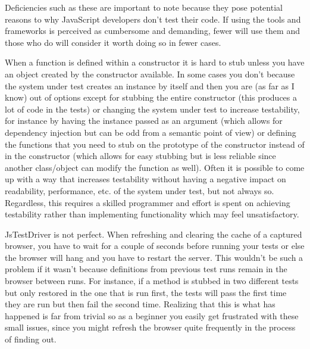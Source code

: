 \documentclass[11pt]{article}
\begin{document}
Deficiencies such as these are important to note because they pose potential reasons to why JavaScript developers don't test their code. If using the tools and frameworks is perceived as cumbersome and demanding, fewer will use them and those who do will consider it worth doing so in fewer cases.

When a function is defined within a constructor it is hard to stub unless you have an object created by the constructor available. In some cases you don't because the system under test creates an instance by itself and then you are (as far as I know) out of options except for stubbing the entire constructor (this produces a lot of code in the tests) or changing the system under test to increase testability, for instance by having the instance passed as an argument (which allows for dependency injection but can be odd from a semantic point of view) or defining the functions that you need to stub on the prototype of the constructor instead of in the constructor (which allows for easy stubbing but is less reliable since another class/object can modify the function as well). Often it is possible to come up with a way that increases testability without having a negative impact on readability, performance, etc. of the system under test, but not always so. Regardless, this requires a skilled programmer and effort is spent on achieving testability rather than implementing functionality which may feel unsatisfactory.

JsTestDriver is not perfect. When refreshing and clearing the cache of a captured browser, you have to wait for a couple of seconds before running your tests or else the browser will hang and you have to restart the server. This wouldn't be such a problem if it wasn't because definitions from previous test runs remain in the browser between runs. For instance, if a method is stubbed in two different tests but only restored in the one that is run first, the tests will pass the first time they are run but then fail the second time. Realizing that this is what has happened is far from trivial so as a beginner you easily get frustrated with these small issues, since you might refresh the browser quite frequently in the process of finding out.
\end{document}
